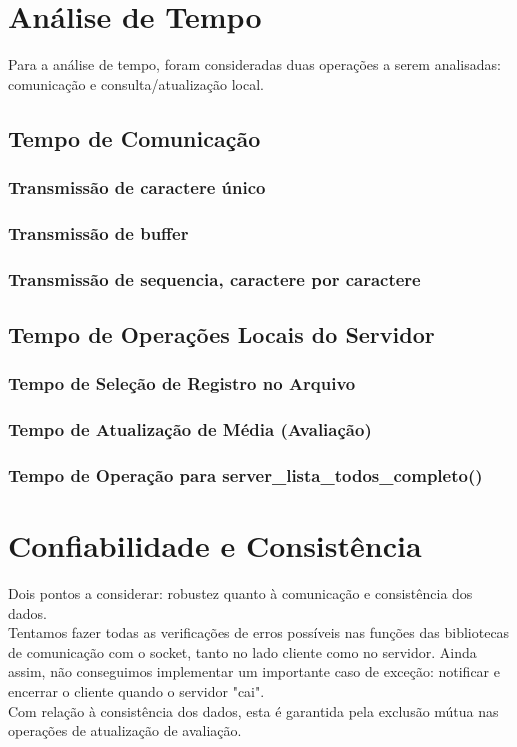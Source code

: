 \documentclass[11pt,twoside]{article}
\begin{document}
\section{Análise de Tempo}
Para a análise de tempo, foram consideradas duas operações a serem analisadas: comunicação e consulta/atualização local.
\subsection{Tempo de Comunicação}
\subsubsection{Transmissão de caractere único}
\subsubsection{Transmissão de buffer}
\subsubsection{Transmissão de sequencia, caractere por caractere}

\subsection{Tempo de Operações Locais do Servidor}
\subsubsection{Tempo de Seleção de Registro no Arquivo}
\subsubsection{Tempo de Atualização de Média (Avaliação)}
\subsubsection{Tempo de Operação para server\_lista\_todos\_completo()}



\section{Confiabilidade e Consistência}
Dois pontos a considerar: robustez quanto à comunicação e consistência dos dados.\\
Tentamos fazer todas as verificações de erros possíveis nas funções das bibliotecas de comunicação com o socket, tanto no lado cliente como no servidor. Ainda assim, não conseguimos implementar um importante caso de exceção: notificar e encerrar o cliente quando o servidor "cai".\\
Com relação à consistência dos dados, esta é garantida pela exclusão mútua nas operações de atualização de avaliação.
\end{document}

